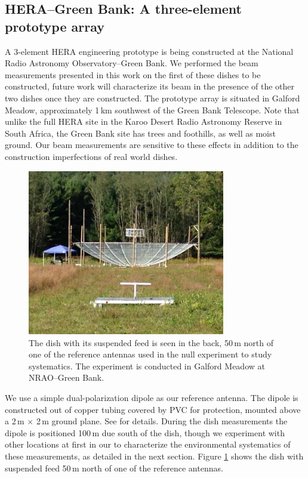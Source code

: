 \documentclass{emulateapj}
\begin{document}
\subsection{HERA--Green Bank: A three-element prototype array}

A 3-element HERA engineering prototype is being constructed at the National Radio 
Astronomy Observatory--Green Bank. We performed the beam measurements presented in 
this work on the first of these dishes to be constructed, future work will characterize its beam in the presence of the other two dishes once they are constructed. The prototype array is situated in Galford Meadow, approximately 1\,km southwest of the Green Bank Telescope. Note that unlike the full HERA site in the Karoo Desert Radio Astronomy Reserve in 
South Africa, the Green Bank site has trees and foothills, as well as moist ground. Our beam measurements
are sensitive to these effects in addition to the construction imperfections of real world dishes.

\begin{figure}[h]
\includegraphics[width=3.4in]{ref_dipole_and_hera_dish.jpg}
\caption{The dish with its suspended feed is seen in the back, 50\,m north of one of the reference antennas used in the null experiment to study systematics. The experiment is conducted in Galford Meadow at NRAO--Green Bank.}
\label{fig:greenbankdishphoto}
\end{figure}

We use a simple dual-polarization dipole as our reference antenna. The dipole is constructed out of copper tubing covered by PVC for protection, mounted above a 2\,m $\times$ 2\,m ground plane. See \citet{neben15} for details. During the dish measurements the dipole is positioned 100\,m due south of the dish, though we experiment with other locations at first in our to characterize the environmental systematics of these measurements, as detailed in the next section. Figure \ref{fig:greenbankdishphoto} shows the dish with suspended feed 50\,m north of one of the reference antennas.
\end{document}

